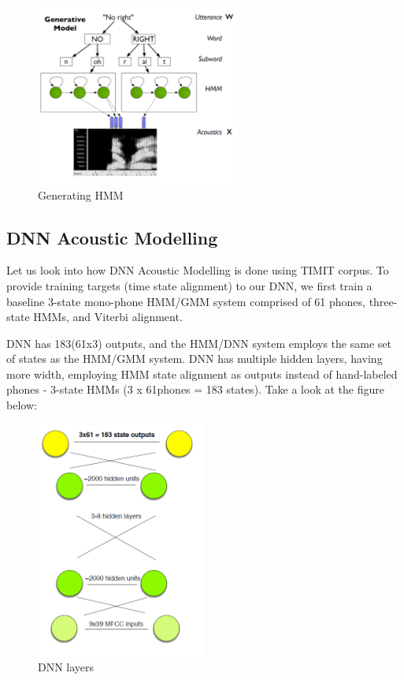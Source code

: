 \begin{figure}[h!]
    \centering
    \includegraphics[width=0.6\textwidth]{img/TrASR1.png}
    \caption{Generating HMM}
    \label{fig:Generating-HMM}
\end{figure}

\subsection{DNN Acoustic Modelling}
Let us look into how DNN Acoustic Modelling is done using TIMIT \cite{garofolo_john_s_timit_1993} corpus. To provide training targets (time state alignment) to our DNN, we first train a baseline 3-state mono-phone HMM/GMM system comprised of 61 phones, three-state HMMs, and Viterbi alignment.

DNN has 183(61x3) outputs, and the HMM/DNN system employs the same set of states as the HMM/GMM system. DNN has multiple hidden layers, having more width, employing HMM state alignment as outputs instead of hand-labeled phones - 3-state HMMs (3 x 61phones = 183 states). Take a look at the figure below: 

\begin{figure}[h!]
    \centering
    \includegraphics[width=0.5\textwidth]{img/timtdnn.png}
    \caption{DNN layers}
    \label{fig:DNN-layers}
\end{figure}

